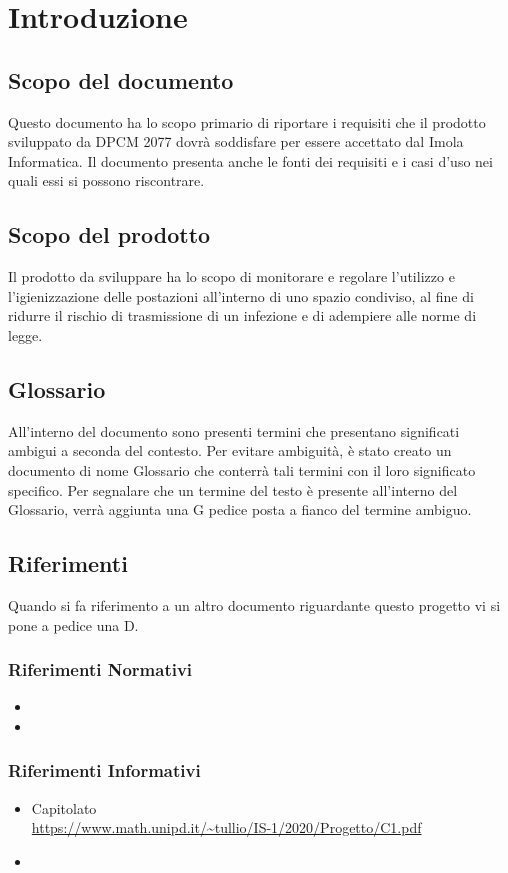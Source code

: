 \section{Introduzione}

\subsection{Scopo del documento}
Questo documento ha lo scopo primario di riportare i requisiti che il prodotto sviluppato da DPCM 2077 dovrà soddisfare per essere accettato dal  Imola Informatica.
Il documento presenta anche le fonti dei requisiti e i casi d'uso nei quali essi si possono riscontrare.
\subsection{Scopo del prodotto}
Il prodotto da sviluppare ha lo scopo di monitorare e regolare l'utilizzo e l'igienizzazione delle postazioni all'interno di uno spazio condiviso, al fine di ridurre il rischio di trasmissione di un infezione e di adempiere alle norme di legge. 
\subsection{Glossario} 
All'interno del  documento sono presenti termini che presentano significati ambigui a seconda del contesto.
Per evitare ambiguità, è stato creato un  documento di nome Glossario che  conterrà tali termini con il loro significato specifico. Per segnalare che un termine del testo è presente all'interno del Glossario, verrà aggiunta una G pedice posta a fianco del termine ambiguo.
\subsection{Riferimenti}
Quando si fa riferimento a un altro documento riguardante questo progetto vi si pone a pedice una D.
\subsubsection{Riferimenti Normativi}
\begin{itemize}
	\item {}
	\item {}
\end{itemize}

\subsubsection{Riferimenti Informativi}
\begin{itemize}
	\item{Capitolato \\
		\url{https://www.math.unipd.it/~tullio/IS-1/2020/Progetto/C1.pdf}}
	\item {}
\end{itemize}